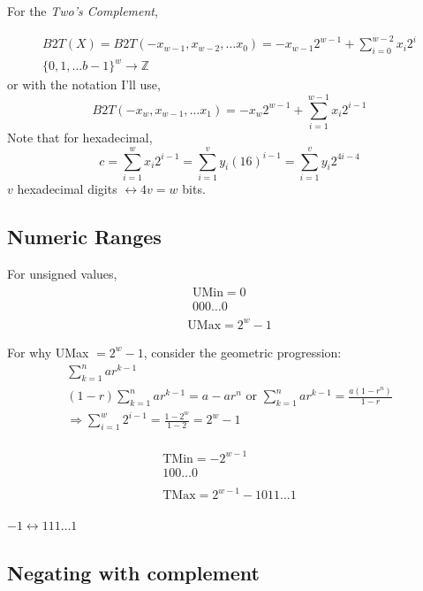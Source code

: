 \documentclass[10pt]{amsart}
\begin{document}
For the \emph{Two's Complement},

\[
\begin{gathered}
B2T(X) = B2T(-x_{w-1}, x_{w-2}, \dots x_0) = -x_{w-1}2^{w-1} + \sum_{i=0}^{w-2} x_i 2^i \\
\lbrace 0 , 1, \dots b-1 \rbrace^w \to \mathbb{Z} 
\end{gathered}
\]
or with the notation I'll use,
\[
B2T(-x_w, x_{w-1}, \dots x_1) = -x_w 2^{w-1} + \sum_{i=1}^{w-1} x_i 2^{i-1}
\]
Note that for hexadecimal,
\[
c = \sum_{i=1}^w x_i 2^{i-1} = \sum_{i=1}^v y_i (16)^{i-1} = \sum_{i=1}^v y_i 2^{4i-4}
\]
$v$ hexadecimal digits $\leftrightarrow  4v = w$ bits.

\subsection{Numeric Ranges}

For unsigned values, 
\[
\begin{gathered}
\begin{gathered} 
\text{UMin} = 0 \\
000 \dots 0 
\end{gathered} \\
\text{UMax} = 2^w - 1  
\end{gathered}
\]

For why UMax $=2^w -1$, consider the geometric progression:
\[
\begin{gathered}
\sum_{k=1}^n ar^{k-1} \\
(1-r) \sum_{k=1}^n ar^{k-1} = a-ar^n \text{ or } \sum_{k=1}^n ar^{k-1} = \frac{a(1-r^n) }{1-r} \\
\Longrightarrow \sum_{i=1}^w 2^{i-1} = \frac{1-2^w}{1-2} = 2^w - 1
\end{gathered}
\]

\[
\begin{gathered}
\begin{gathered} 
\text{TMin} = -2^{w-1} \\
100 \dots 0 
\end{gathered} \\
\begin{gathered} 
\text{TMax} = 2^{w-1} - 1
011\dots 1
\end{gathered}
\end{gathered} 
\]

$-1 \leftrightarrow 111 \dots 1$


\subsection{Negating with complement}
\end{document}
